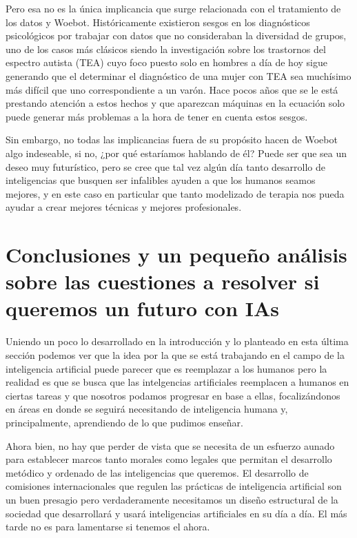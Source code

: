 \documentclass[11pt]{article}
\begin{document}
Pero esa no es la única implicancia que surge relacionada
con el tratamiento de los datos y Woebot. Históricamente 
existieron sesgos en los diagnósticos psicológicos por 
trabajar con datos que no consideraban la diversidad de
grupos, uno de los casos más clásicos siendo la 
investigación sobre los trastornos del espectro autista
(TEA)
cuyo foco puesto solo en hombres a día de hoy sigue 
generando que el determinar el diagnóstico de una 
mujer con TEA sea muchísimo más difícil que uno
correspondiente a un varón. Hace pocos años que 
se le está prestando atención a estos hechos y 
que aparezcan máquinas
en la ecuación solo puede generar más problemas a la 
hora de tener en cuenta estos sesgos. 

Sin embargo, no todas las implicancias fuera de su propósito
hacen de Woebot algo indeseable, si no, ¿por qué estaríamos 
hablando de él? Puede ser que sea un deseo muy futurístico,
pero se cree que tal vez algún día tanto desarrollo de 
inteligencias que busquen ser infalibles ayuden a que los
humanos seamos mejores, y en este caso en particular que 
tanto modelizado de terapia nos pueda ayudar a crear 
mejores técnicas y mejores profesionales.


\section{Conclusiones y un pequeño análisis sobre las cuestiones a resolver si queremos un futuro con IAs}
Uniendo un poco lo desarrollado en la introducción y
lo planteado en esta última sección podemos ver que la 
idea por la que se está trabajando en el campo de la 
inteligencia artificial puede parecer que es 
reemplazar a los humanos pero la realidad es que se busca
que las intelgencias artificiales reemplacen a humanos en 
ciertas tareas y que nosotros podamos progresar en base a 
ellas, focalizándonos en áreas en donde se seguirá 
necesitando de inteligencia humana y, principalmente, 
aprendiendo de lo que pudimos enseñar.

Ahora bien, no hay que perder de vista que se necesita 
de un esfuerzo aunado para establecer marcos 
tanto morales como legales que permitan el desarrollo 
metódico y ordenado
de las inteligencias que queremos. El desarrollo de 
comisiones internacionales que regulen las 
prácticas de inteligencia artificial son un buen presagio 
pero verdaderamente necesitamos un diseño estructural 
de la sociedad que desarrollará y usará inteligencias 
artificiales en su día a día. El más tarde no es
para lamentarse si tenemos el ahora.
\end{document}
